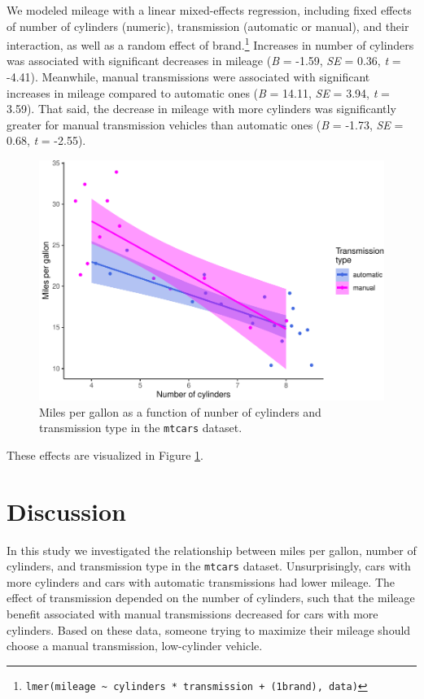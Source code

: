 \documentclass[
  english,
  man,floatsintext]{apa6}
\begin{document}
We modeled mileage with a linear mixed-effects regression, including fixed effects of number of cylinders (numeric), transmission (automatic or manual), and their interaction, as well as a random effect of brand.\footnote{\texttt{lmer(mileage\ \textasciitilde{}\ cylinders\ *\ transmission\ +\ (1\textbar{}brand),\ data)}} Increases in number of cylinders was associated with significant decreases in mileage (\emph{B} = -1.59, \emph{SE} = 0.36, \emph{t} = -4.41). Meanwhile, manual transmissions were associated with significant increases in mileage compared to automatic ones (\emph{B} = 14.11, \emph{SE} = 3.94, \emph{t} = 3.59). That said, the decrease in mileage with more cylinders was significantly greater for manual transmission vehicles than automatic ones (\emph{B} = -1.73, \emph{SE} = 0.68, \emph{t} = -2.55).

\begin{figure}
\centering
\includegraphics{mpg-report-papaja_files/figure-latex/plot-primary-results-1.pdf}
\caption{\label{fig:plot-primary-results}Miles per gallon as a function of nunber of cylinders and transmission type in the \texttt{mtcars} dataset.}
\end{figure}

These effects are visualized in Figure \ref{fig:plot-primary-results}.

\hypertarget{discussion}{%
\section{Discussion}\label{discussion}}

In this study we investigated the relationship between miles per gallon, number of cylinders, and transmission type in the \texttt{mtcars} dataset. Unsurprisingly, cars with more cylinders and cars with automatic transmissions had lower mileage. The effect of transmission depended on the number of cylinders, such that the mileage benefit associated with manual transmissions decreased for cars with more cylinders. Based on these data, someone trying to maximize their mileage should choose a manual transmission, low-cylinder vehicle.
\end{document}
